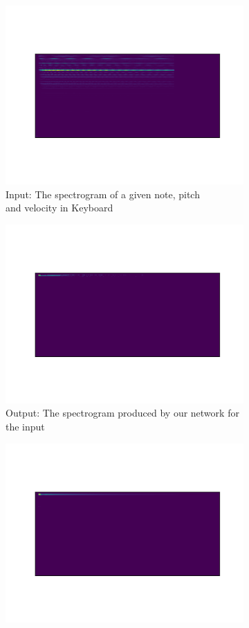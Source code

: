 \documentclass{article}
\begin{document}
\begin{figure}[h]
\begin{subfigure}{.5\textwidth}
  \centering
  \includegraphics[width=.8\linewidth]{input.png}
  \caption{Input: The spectrogram of a given note, pitch\\ and velocity in Keyboard}
  \label{fig:sfig1}
\end{subfigure}%
\begin{subfigure}{.5\textwidth}
  \centering
  \includegraphics[width=.8\linewidth]{out.png}
  \caption{Output: The spectrogram produced by our network for the input}
  \label{fig:sfig2}
\end{subfigure}
\begin{subfigure}{.5\textwidth}
  \centering
  \includegraphics[width=.8\linewidth]{exp_out.png}

\end{subfigure}
\end{figure}
\end{document}
